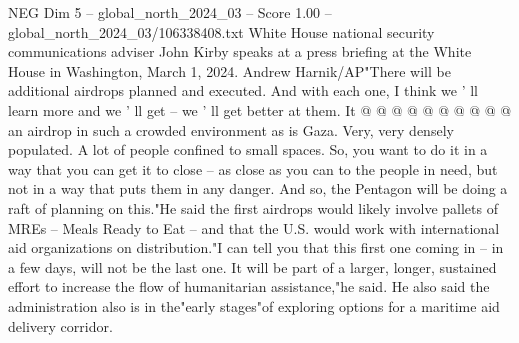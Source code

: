 \begin{textsample}{NEG Dim 5 – global\_north\_2024\_03 – Score 1.00 – global\_north\_2024\_03/106338408.txt}
White House national security communications adviser John Kirby speaks at a press briefing at the White House in Washington, March 1, 2024.
Andrew Harnik/AP"There will be additional airdrops planned and executed.
And with each one, I think we ' ll learn more and we ' ll get -- we ' ll get better at them.
It @ @ @ @ @ @ @ @ @ @ an airdrop in such a crowded environment as is Gaza.
Very, very densely populated.
A lot of people confined to small spaces.
So, you want to do it in a way that you can get it to close -- as close as you can to the people in need, but not in a way that puts them in any danger.
And so, the Pentagon will be doing a raft of planning on this."He said the first airdrops would likely involve pallets of MREs -- Meals Ready to Eat -- and that the U.S. would work with international aid organizations on distribution."I can tell you that this first one coming in -- in a few days, will not be the last one.
It will be part of a larger, longer, sustained effort to increase the flow of humanitarian assistance,"he said.
He also said the administration also is in the"early stages"of exploring options for a maritime aid delivery corridor.

\end{textsample}
